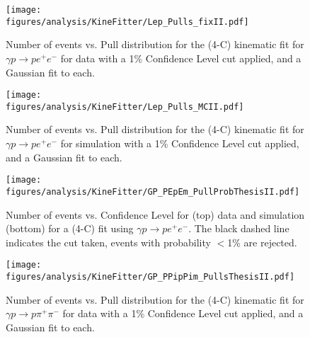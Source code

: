 \begin{figure}[h!]\begin{center}
\texttt{[image: \\figures/analysis/KineFitter/Lep\_Pulls\_fixII.pdf]}
\caption[Number of events vs. Pull distribution for the (4-C) kinematic fit for $\gamma p \rightarrow p e^+ e^-$ for  data with a 1\% Confidence Level cut applied, and a Gaussian fit to each]{\label{fig:kinfit.LepPullData}Number of events vs. Pull distribution for the (4-C) kinematic fit for $\gamma p \rightarrow p e^+ e^-$ for  data with a 1\% Confidence Level cut applied, and a Gaussian fit to each.}
\end{center}\end{figure}
%
%
\begin{figure}[h!]\begin{center}
\texttt{[image: \\figures/analysis/KineFitter/Lep\_Pulls\_MCII.pdf]}
\caption[Number of events vs. Pull distribution for the (4-C) kinematic fit for $\gamma p \rightarrow p e^+ e^-$ for  simulation with a 1\% Confidence Level cut applied, and a Gaussian fit to each]{\label{fig:kinfit.LepPullMC}Number of events vs. Pull distribution for the (4-C) kinematic fit for $\gamma p \rightarrow p e^+ e^-$ for  simulation with a 1\% Confidence Level cut applied, and a Gaussian fit to each.}
\end{center}\end{figure}
%
%
\begin{figure}[h!]\begin{center}
\texttt{[image: \\figures/analysis/KineFitter/GP\_PEpEm\_PullProbThesisII.pdf]}
\caption[Number of events vs. Confidence Level for  (top) data and  simulation (bottom) for a (4-C) fit using $\gamma p \rightarrow p e^+ e^-$]{\label{fig:kinfit.LepPullProb}Number of events vs. Confidence Level for  (top) data and  simulation (bottom) for a (4-C) fit using $\gamma p \rightarrow p e^+ e^-$. The black dashed line indicates the cut taken, events with probability $<$1\% are rejected.}
\end{center}\end{figure}
%
\begin{figure}[h!]\begin{center}
\texttt{[image: \\figures/analysis/KineFitter/GP\_PPipPim\_PullsThesisII.pdf]}
\caption[Number of events vs. Pull distribution for the (4-C) kinematic fit for $\gamma p \rightarrow p \pi^+ \pi^-$ for  data with a 1\% Confidence Level cut applied, and a Gaussian fit to each]{\label{fig:kinfit.PiPullData}Number of events vs. Pull distribution for the (4-C) kinematic fit for $\gamma p \rightarrow p \pi^+ \pi^-$ for  data with a 1\% Confidence Level cut applied, and a Gaussian fit to each.}
\end{center}\end{figure}
